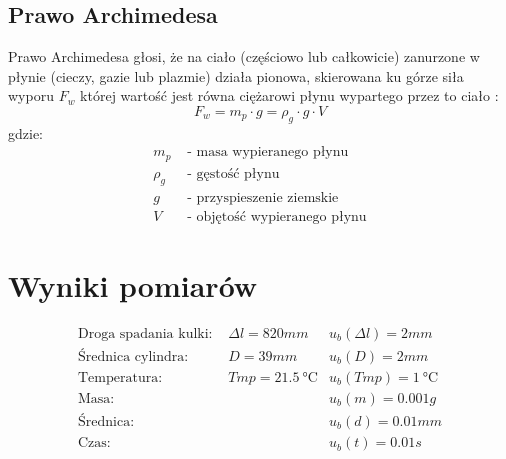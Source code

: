 \documentclass[a4paper,12pt]{article}
\begin{document}
\begin{justify}
\subsection{Prawo Archimedesa}
Prawo Archimedesa głosi, że na ciało (częściowo lub całkowicie) zanurzone w płynie (cieczy, gazie lub plazmie) działa pionowa, skierowana ku górze siła wyporu $F_{w}$ której wartość jest równa ciężarowi płynu wypartego przez to ciało \cite{arch}:
\begin{equation}
F_{w} = m_{p} \cdot g = \rho_{g} \cdot g \cdot V
\end{equation}
gdzie:
\begin{align*}
m_{p} & \text{ - masa wypieranego płynu} \\
\rho_{g} &\text{ - gęstość płynu} \\
g & \text{ - przyspieszenie ziemskie} \\
V & \text{ - objętość wypieranego płynu}
\end{align*}

\section{Wyniki pomiarów}

\begin{align*}
\text{Droga spadania kulki: } & \Delta l = 820mm & u_{b}(\Delta l) = 2mm \\
\text{Średnica cylindra: } & D = 39mm & u_{b}(D) = 2mm \\
\text{Temperatura: } & Tmp = \SI{21.5}{\celsius} & u_{b}(Tmp) = \SI{1}{\celsius} \\
\text{Masa: } & & u_{b}(m) = 0.001g \\
\text{Średnica: } & & u_{b}(d) = 0.01mm \\
\text{Czas: } & & u_{b}(t) = 0.01s
\end{align*}


\end{justify}
\end{document}
